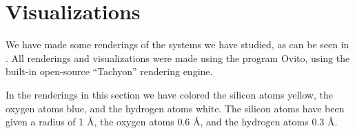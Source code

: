 \section{Visualizations}
We have made some renderings of the systems we have studied, as can be seen in . All renderings and visualizations were made using the program Ovito\cite{stukowski2010ovito}, using the built-in open-source ``Tachyon'' rendering engine.

In the renderings in this section we have colored the silicon atoms yellow, the oxygen atoms blue, and the hydrogen atoms white. The silicon atoms have been given a radius of 1 \AA, the oxygen atoms 0.6 \AA, and the hydrogen atoms 0.3 \AA.

